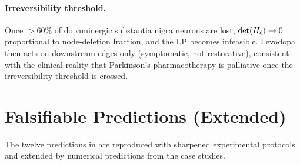 \paragraph{Irreversibility threshold.}
Once $> 60\%$ of dopaminergic substantia nigra neurons are lost,
$\det(H_\ell) \to 0$ proportional to node-deletion fraction, and the LP
becomes infeasible.  Levodopa then acts on downstream edges only
(symptomatic, not restorative), consistent with the clinical reality that
Parkinson's pharmacotherapy is palliative once the irreversibility threshold
is crossed.

\section{Falsifiable Predictions (Extended)}
\label{sec:ch09-predictions-extended}

The twelve predictions in  are reproduced
with sharpened experimental protocols and extended by numerical predictions
from the case studies.

